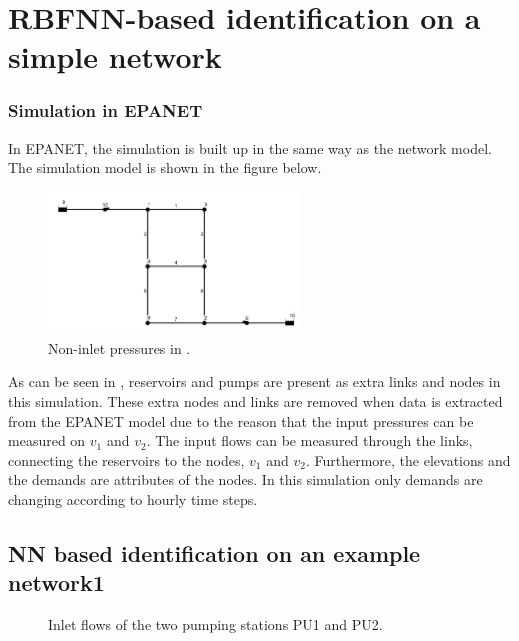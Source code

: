 \chapter{RBFNN-based identification on a simple network}
\label{NN_based_example}

\subsection{Simulation in EPANET}
\label{example1_EPANET}

In EPANET, the simulation is built up in the same way as the network model. The simulation model is shown in the figure below. 

\begin{figure}[H]
\centering
\includegraphics[width=0.6\textwidth]{report/pictures/example1_epanetmodel}
% 
\caption{Non-inlet pressures in .}
\label{fig:epanet_example1}
\end{figure}

As can be seen in , reservoirs and pumps are present as extra links and nodes in this simulation. These extra nodes and links are removed when data is extracted from the EPANET model due to the reason that the input pressures can be measured on $v_1$ and $v_2$. The input flows can be measured through the links, connecting the reservoirs to the nodes, $v_1$ and $v_2$. Furthermore, the elevations and the demands are attributes of the nodes. In this simulation only demands are changing according to hourly time steps. 


\section{NN based identification on an example network1}
\label{NN_based_example1} 

 \begin{figure}[H]
 \centering
  
 \vspace{-1.5mm}
 \caption{Inlet flows of the two pumping stations PU1 and PU2.}
 \label{fig:inlet_flows_example1}
 \end{figure}

